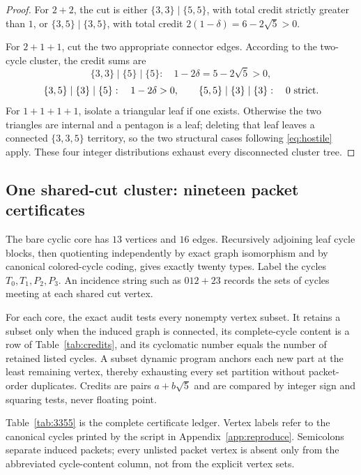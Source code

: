 \documentclass[11pt]{article}
\theoremstyle{remark}
\begin{document}
\begin{proof}
For $2+2$, the cut is either
$\{3,3\}\mid\{5,5\}$, with total credit strictly greater than $1$, or
$\{3,5\}\mid\{3,5\}$, with total credit
$2(1-\delta)=6-2\sqrt5>0$.

For $2+1+1$, cut the two appropriate connector edges.  According to the
two-cycle cluster, the credit sums are
\[
 \{3,3\}\mid\{5\}\mid\{5\}:\quad 1-2\delta=5-2\sqrt5>0,
\]
\[
 \{3,5\}\mid\{3\}\mid\{5\}:\quad 1-2\delta>0,
 \qquad
 \{5,5\}\mid\{3\}\mid\{3\}:\quad 0\ \hbox{strict}.
\]
For $1+1+1+1$, isolate a triangular leaf if one exists.  Otherwise the two
triangles are internal and a pentagon is a leaf; deleting that leaf leaves a
connected $\{3,3,5\}$ territory, so the two structural cases following
\eqref{eq:hostile} apply.  These four integer
distributions exhaust every disconnected cluster tree.
\end{proof}

\subsection{One shared-cut cluster: nineteen packet certificates}

The bare cyclic core has $13$ vertices and $16$ edges.  Recursively adjoining
leaf cycle blocks, then quotienting independently by exact graph isomorphism
and by canonical colored-cycle coding, gives exactly twenty types.  Label the
cycles $T_0,T_1,P_2,P_3$.  An incidence string such as $012+23$ records the
sets of cycles meeting at each shared cut vertex.

For each core, the exact audit tests every nonempty vertex subset.  It retains
a subset only when the induced graph is connected, its complete-cycle content
is a row of Table~\ref{tab:credits}, and its cyclomatic number equals the
number of retained listed cycles.  A subset dynamic program anchors each new
part at the least remaining vertex, thereby exhausting every set partition
without packet-order duplicates.  Credits are pairs $a+b\sqrt5$ and are
compared by integer sign and squaring tests, never floating point.

Table~\ref{tab:3355} is the complete certificate ledger.  Vertex labels refer
to the canonical cycles printed by the script in Appendix~\ref{app:reproduce}.
Semicolons separate induced packets; every unlisted packet vertex is absent
only from the abbreviated cycle-content column, not from the explicit vertex
sets.
\end{document}
